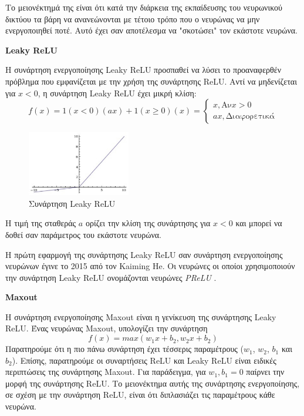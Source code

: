 Το μειονέκτημά της είναι ότι κατά την διάρκεια της εκπαίδευσης του νευρωνικού
δικτύου τα βάρη να ανανεώνονται με τέτοιο τρόπο που ο νευρώνας να μην ενεργοποιηθεί
ποτέ. Αυτό έχει σαν αποτέλεσμα να "σκοτώσει" τον εκάστοτε νευρώνα.

\textbf{Leaky ReLU}

Η συνάρτηση ενεργοποίησης Leaky ReLU προσπαθεί να λύσει το προαναφερθέν
πρόβλημα που εμφανίζεται με την χρήση της συνάρτησης ReLU. Αντί να μηδενίζεται
για $x < 0$, η συνάρτηση Leaky ReLU έχει μικρή κλίση:
\begin{equation*}
  f(x) = 1(x<0)(ax) + 1(x\geq0)(x) =
  \begin{cases}
    x, \text{Αν} x>0 \\
    ax, \text{Διαφορετικά}
  \end{cases}
\end{equation*}

\begin{figure}[!ht]
  \centering
  \includegraphics[width=0.4\textwidth]{./images/chapter3/leaky.png}
  \caption[Συνάρτηση Leaky ReLU]{Συνάρτηση Leaky ReLU}
  \label{fig:leaky}
\end{figure}

Η τιμή της σταθεράς $a$ ορίζει την κλίση της συνάρτησης για $x<0$ και μπορεί να δοθεί
σαν παράμετρος του εκάστοτε νευρώνα.

Η πρώτη εφαρμογή της συνάρτησης
Leaky ReLU σαν συνάρτηση ενεργοποίησης νευρώνων έγινε
το 2015 από τον Kaiming He. Οι νευρώνες οι οποίοι χρησιμοποιούν την
συνάρτηση Leaky ReLU ονομάζονται νευρώνες \emph{PReLU} \cite{DBLP:journals/corr/HeZR015}.

\textbf{Maxout}

Η συνάρτηση ενεργοποίησης Maxout \cite{goodfellow2013maxout} είναι η γενίκευση της συνάρτησης Leaky ReLU.
Ένας νευρώνας Maxout, υπολογίζει την συνάρτηση
\begin{equation*}
  f(x) = max(w_{1}x+b_{2}, w_{2}x+b_{2})
\end{equation*}
Παρατηρούμε ότι η πιο πάνω συνάρτηση έχει τέσσερις παραμέτρους
($w_{1}$, $w_{2}$, $b_{1}$ και $b_{2}$). Επίσης, παρατηρούμε οι συναρτήσεις
ReLU και Leaky ReLU είναι ειδικές περιπτώσεις της συνάρτησης Maxout.
Για παράδειγμα, για $w_{1}, b_{1} = 0$ παίρνει την μορφή της συνάρτησης ReLU.
Το μειονέκτημα αυτής της συνάρτησης ενεργοποίησης, σε σχέση με την συνάρτηση
ReLU, είναι ότι διπλασιάζει τις παραμέτρους κάθε νευρώνα.

